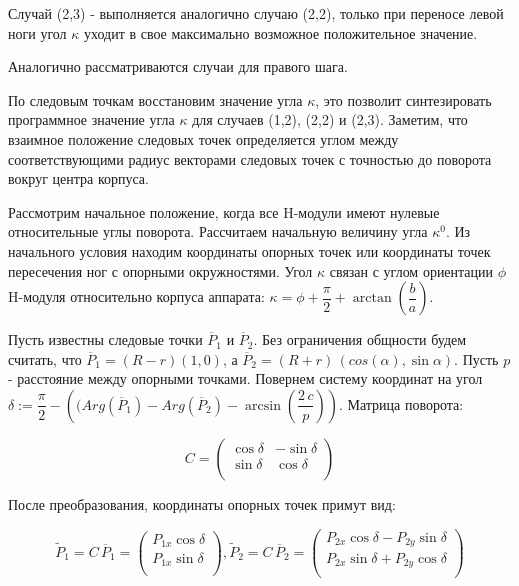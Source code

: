 Случай (2,3) - выполняется аналогично случаю (2,2), только при переносе левой ноги угол $\kappa$ уходит в свое максимально возможное положительное значение.

Аналогично рассматриваются случаи для правого шага.

По следовым точкам восстановим значение угла $\kappa$, это позволит синтезировать программное значение угла $\kappa$ для случаев (1,2), (2,2) и (2,3). Заметим, что взаимное положение следовых точек определяется углом между соответствующими радиус векторами следовых точек с точностью до поворота вокруг центра корпуса.


Рассмотрим начальное положение, когда все H-модули имеют нулевые относительные углы поворота. Рассчитаем начальную величину угла $\kappa^0$. Из начального условия находим координаты опорных точек или координаты точек пересечения ног с опорными окружностями. Угол $\kappa$ связан с углом ориентации $\phi$ H-модуля относительно корпуса аппарата: $\kappa = \phi+\dfrac{\pi}{2}+\arctan{\left(\dfrac{b}{a}\right)}$.

Пусть известны следовые точки $\overline{P}_1$ и $\overline{P}_2$. Без ограничения общности будем считать, что $\overline{P}_1 = (R-r)(1,0)$, а $\overline{P}_2 = (R+r)\,(cos(\alpha),\sin{\alpha})$. Пусть $p$ - расстояние между опорными точками. Повернем систему координат на угол $\delta := \dfrac{\pi}{2}-\left((Arg(\overline{P}_1)-Arg(\overline{P}_2)-\arcsin\left(\dfrac{2\,c}{p}\right)\right)$. Матрица поворота:

$$
C = \left(\begin{array}{ccc}
\cos{\delta} &-\sin{\delta}\\
\sin{\delta} & \cos{\delta}\\
\end{array}\right)
$$

После преобразования, координаты опорных точек примут вид:

$$
\tilde{P}_1 = C\,\overline{P}_1 = \left(\begin{array}{ccc}
P_{1x}\cos{\delta}\\
P_{1x}\sin{\delta}\\
\end{array}\right),
\tilde{P}_2 = C\,\overline{P}_2 = \left(\begin{array}{ccc}
P_{2x}\cos{\delta}-P_{2y}\sin{\delta}\\
P_{2x}\sin{\delta}+P_{2y}\cos{\delta}\\
\end{array}
\right)
$$

